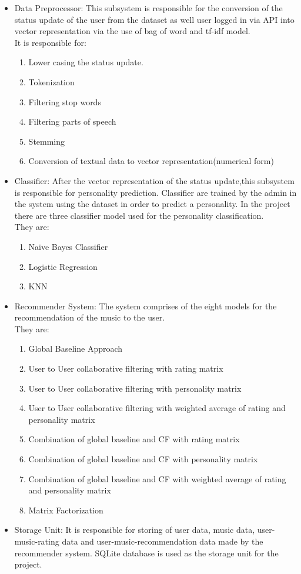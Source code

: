 \begin{itemize}
	\item Data Preprocessor: This subsystem is responsible for the conversion of the status update of the user from the dataset \cite{dataset} as well user logged in via API \cite{api} into vector representation via the use of bag of word and tf-idf model.\\
It is responsible for:
		\begin{enumerate}
			\item Lower casing the status update.
			\item Tokenization
			\item Filtering stop words
			\item Filtering parts of speech
			\item Stemming
			\item Conversion of textual data to vector representation(numerical form)
		\end{enumerate}
	\item Classifier: After the vector representation of the status update,this subsystem is responsible for personality prediction. Classifier are trained by the admin in the system using the dataset \cite{dataset} in order to predict a personality. In the project there are three classifier model used for the personality classification.\\
They are:
\begin{enumerate}
	\item Naive Bayes Classifier
	\item Logistic Regression
	\item KNN
\end{enumerate}
\item Recommender System: The system comprises of the eight models for the recommendation of the music to the user.\\
They are:
\begin{enumerate}
	\item Global Baseline Approach
	\item User to User collaborative filtering with rating matrix
	\item User to User collaborative filtering with personality matrix
	\item User to User collaborative filtering with weighted average of rating and personality matrix
	\item Combination of global baseline and CF with rating matrix
	\item Combination of global baseline and CF with personality matrix
	\item Combination of global baseline and CF with weighted average of rating and personality matrix
	\item Matrix Factorization
\end{enumerate}
\item Storage Unit: It is responsible for storing of user data, music data, user-music-rating data and user-music-recommendation data made by the recommender system. SQLite database is used as the storage unit for the project.
\end{itemize}

